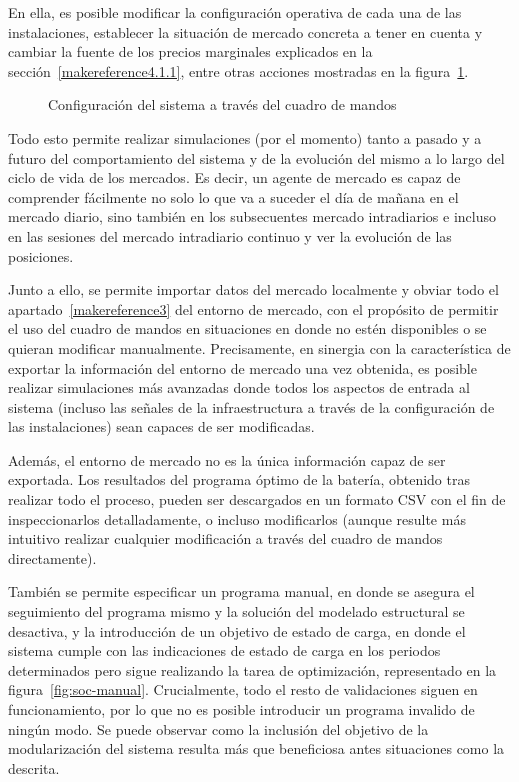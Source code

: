 En ella, es posible modificar la configuración operativa de cada una de las instalaciones, establecer la situación de mercado concreta a tener en cuenta y cambiar la fuente de los precios marginales explicados en la sección~\ref{makereference4.1.1}, entre otras acciones mostradas en la figura~\ref{fig:configuración-sistema}.

\begin{figure}
  \centering
  \caption{Configuración del sistema a través del cuadro de mandos}
  \label{fig:configuración-sistema}
\end{figure}

Todo esto permite realizar simulaciones (por el momento) tanto a pasado y a futuro del comportamiento del sistema y de la evolución del mismo a lo largo del ciclo de vida de los mercados. Es decir, un agente de mercado es capaz de comprender fácilmente no solo lo que va a suceder el día de mañana en el mercado diario, sino también en los subsecuentes mercado intradiarios e incluso en las sesiones del mercado intradiario continuo y ver la evolución de las posiciones.

Junto a ello, se permite importar datos del mercado localmente y obviar todo el apartado~\ref{makereference3} del entorno de mercado, con el propósito de permitir el uso del cuadro de mandos en situaciones en donde no estén disponibles o se quieran modificar manualmente. Precisamente, en sinergia con la característica de exportar la información del entorno de mercado una vez obtenida, es posible realizar simulaciones más avanzadas donde todos los aspectos de entrada al sistema (incluso las señales de la infraestructura a través de la configuración de las instalaciones) sean capaces de ser modificadas.

Además, el entorno de mercado no es la única información capaz de ser exportada. Los resultados del programa óptimo de la batería, obtenido tras realizar todo el proceso, pueden ser descargados en un formato CSV con el fin de inspeccionarlos detalladamente, o incluso modificarlos (aunque resulte más intuitivo realizar cualquier modificación a través del cuadro de mandos directamente).

También se permite especificar un programa manual, en donde se asegura el seguimiento del programa mismo y la solución del modelado estructural se desactiva, y la introducción de un objetivo de estado de carga, en donde el sistema cumple con las indicaciones de estado de carga en los periodos determinados pero sigue realizando la tarea de optimización, representado en la figura~\ref{fig:soc-manual}. Crucialmente, todo el resto de validaciones siguen en funcionamiento, por lo que no es posible introducir un programa invalido de ningún modo. Se puede observar como la inclusión del objetivo de la modularización del sistema resulta más que beneficiosa antes situaciones como la descrita.


